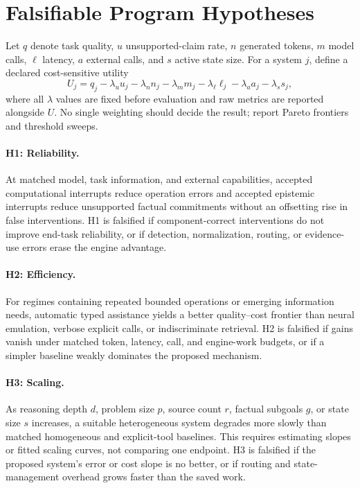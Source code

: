 \documentclass[11pt]{article}
\begin{document}
\section{Falsifiable Program Hypotheses}

Let $q$ denote task quality, $u$ unsupported-claim rate, $n$ generated tokens,
$m$ model calls, $\ell$ latency, $a$ external calls, and $s$ active state size.
For a system $j$, define a declared cost-sensitive utility
\[
  U_j=q_j-\lambda_u u_j-\lambda_n n_j-\lambda_m m_j
      -\lambda_\ell \ell_j-\lambda_a a_j-\lambda_s s_j,
\]
where all $\lambda$ values are fixed before evaluation and raw metrics are
reported alongside $U$.  No single weighting should decide the result; report
Pareto frontiers and threshold sweeps.

\paragraph{H1: Reliability.}
At matched model, task information, and external capabilities, accepted
computational interrupts reduce operation errors and accepted epistemic
interrupts reduce unsupported factual commitments without an offsetting rise in
false interventions.  H1 is falsified if component-correct interventions do not
improve end-task reliability, or if detection, normalization, routing, or
evidence-use errors erase the engine advantage.

\paragraph{H2: Efficiency.}
For regimes containing repeated bounded operations or emerging information
needs, automatic typed assistance yields a better quality--cost frontier than
neural emulation, verbose explicit calls, or indiscriminate retrieval.  H2 is
falsified if gains vanish under matched token, latency, call, and engine-work
budgets, or if a simpler baseline weakly dominates the proposed mechanism.

\paragraph{H3: Scaling.}
As reasoning depth $d$, problem size $p$, source count $r$, factual subgoals $g$,
or state size $s$ increases, a suitable heterogeneous system degrades more
slowly than matched homogeneous and explicit-tool baselines.  This requires
estimating slopes or fitted scaling curves, not comparing one endpoint.  H3 is
falsified if the proposed system's error or cost slope is no better, or if
routing and state-management overhead grows faster than the saved work.
\end{document}
